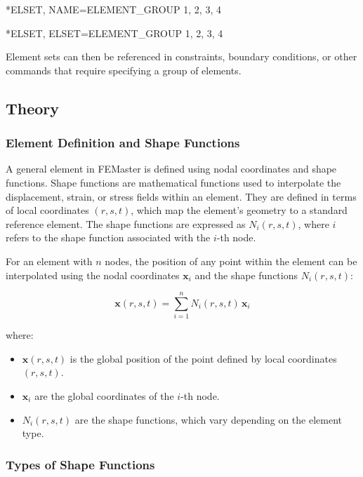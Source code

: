 \begin{codeBlock}
*ELSET, NAME=ELEMENT_GROUP
1, 2, 3, 4
\end{codeBlock}

\begin{codeBlock}
*ELSET, ELSET=ELEMENT_GROUP
1, 2, 3, 4
\end{codeBlock}

Element sets can then be referenced in constraints, boundary conditions, or other commands that require specifying a group of elements.

\subsection{Theory}

\subsubsection{Element Definition and Shape Functions}

A general element in FEMaster is defined using nodal coordinates and shape functions. Shape functions are mathematical functions used to interpolate the displacement, strain, or stress fields within an element. They are defined in terms of local coordinates \((r, s, t)\), which map the element's geometry to a standard reference element. The shape functions are expressed as \( N_i(r, s, t) \), where \( i \) refers to the shape function associated with the \(i\)-th node.

For an element with \( n \) nodes, the position of any point within the element can be interpolated using the nodal coordinates \( \mathbf{x}_i \) and the shape functions \( N_i(r, s, t) \):

\[
\mathbf{x}(r, s, t) = \sum_{i=1}^{n} N_i(r, s, t) \, \mathbf{x}_i
\]

where:
\begin{itemize}
    \item \( \mathbf{x}(r, s, t) \) is the global position of the point defined by local coordinates \( (r, s, t) \).
    \item \( \mathbf{x}_i \) are the global coordinates of the \(i\)-th node.
    \item \( N_i(r, s, t) \) are the shape functions, which vary depending on the element type.
\end{itemize}

\subsubsection{Types of Shape Functions}


